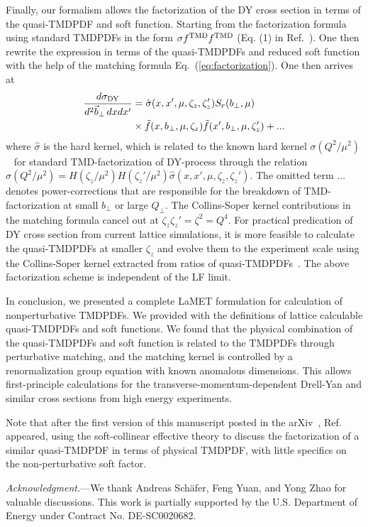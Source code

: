 \documentclass[twocolumn,aps,prd,preprintnumbers,superscriptaddress,10pt]{revtex4-1}
\begin{document}
Finally, our formalism allows the factorization of the DY cross section in terms of the quasi-TMDPDF and soft function. Starting from the factorization formula using standard TMDPDFs in the form $\sigma f^{\rm TMD}f^{\rm TMD}$ (Eq. (1) in Ref.~\cite{Collins:2012uy}). One then rewrite the expression in terms of the quasi-TMDPDFs and
reduced soft function with the help of the matching formula Eq.~(\ref{eq:factorization}).
One then arrives at \cite{Ji:2019sxk}
\begin{align}\label{eq:sigma_DY}
\frac{d\sigma_{\rm DY}}{d^2\vec b_\perp\, dx dx'}&=\hat\sigma(x,x',\mu,\zeta_z,\zeta_z')S_r(b_\perp,\mu)\\
&\times\tilde f(x,b_\perp,\mu,\zeta_z)\tilde f(x',b_\perp,\mu,\zeta_z')+ ...\nonumber
\end{align}
where $\hat\sigma$ is the hard kernel, which is related to the known hard kernel $\sigma(Q^2/\mu^2)$~\cite{Moch:2005tm,Baikov:2009bg} for standard TMD-factorization of DY-process through the relation $\sigma(Q^2/\mu^2)= H(\zeta_z/\mu^2)H(\zeta_z'/\mu^2)\hat\sigma(x,x',\mu,\zeta_z,\zeta_z')$. The omitted term $...$ denotes power-corrections that are responsible for the breakdown of TMD-factorization at small $b_\perp$ or large $Q_\perp$. The Collins-Soper kernel contributions in the matching formula cancel out at $\zeta_z\zeta_z'=\zeta^2=Q^4$. For practical predication of DY cross section from current lattice simulations, it is more feasible to calculate the quasi-TMDPDFs at smaller $\zeta_z$ and evolve them to the experiment scale using the Collins-Soper kernel extracted from ratios of quasi-TMDPDFs~\cite{Ebert:2018gzl,Shanahan:2019zcq,Zhang:2020dbb}.
%
The above factorization scheme is independent of the LF limit.

In conclusion, we presented a complete LaMET formulation for calculation of nonperturbative TMDPDFs.
We provided with the definitions of lattice calculable quasi-TMDPDFs and soft functions.
We found that the physical combination of the quasi-TMDPDFs and soft function
is related to the TMDPDFs through perturbative matching,
and the matching kernel is controlled by a renormalization group equation with known anomalous dimensions.
This allows first-principle calculations for the transverse-momentum-dependent
Drell-Yan and similar cross sections from high energy experiments.

Note that after the first version of this manuscript posted in the arXiv~\cite{Ji:2019ewn},
Ref.~\cite{Vladimirov:2020ofp} appeared, using the soft-collinear effective theory to discuss
the factorization of a similar quasi-TMDPDF in terms of physical TMDPDF, with little specifics on the
non-perturbative soft factor.

{\it Acknowledgment.}---We thank Andreas Sch\"afer, Feng Yuan, and Yong Zhao for valuable discussions.
This work is partially supported by the U.S. Department of Energy under Contract No. DE-SC0020682.



\end{document}
